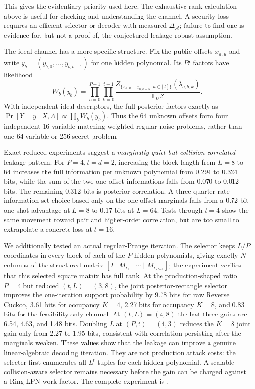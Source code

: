 This gives the evidentiary priority used here.  The exhaustive-rank calculation
above is useful for checking and understanding the channel.  A security loss
requires an efficient selector or decoder with measured $\Delta_{\mathcal A}$;
failure to find one is evidence for, but not a proof of, the conjectured
leakage-robust assumption.

The ideal channel has a more specific structure.  Fix the public offsets
$x_{a,u}$ and write $y_b=(y_{b,0},\ldots,y_{b,t-1})$ for one hidden
polynomial.  Its $Pt$ factors have likelihood
\[
 W_b(y_b)=\prod_{a=0}^{P-1}\prod_{k=0}^{t-1}
 \frac{Z_{\{x_{a,u}+y_{b,k-u}:u\in[t]\}}(\lambda_{a,b,k})}
      {\mathbb E_U Z}.
\]
With independent ideal descriptors, the full posterior factors exactly as
$\Pr[Y=y\mid X,\Lambda]\propto\prod_b W_b(y_b)$.  Thus the 64 unknown
offsets form four independent 16-variable matching-weighted regular-noise
problems, rather than one 64-variable or 256-secret problem.

Exact reduced experiments suggest a \emph{marginally quiet but
collision-correlated} leakage pattern.  For $P=4,t=d=2$, increasing the block
length from $L=8$ to 64 increases the full information per unknown polynomial
from 0.294 to 0.324 bits, while the sum of the two one-offset informations
falls from 0.070 to 0.012 bits.  The remaining 0.312 bits is posterior
correlation.  A three-quarter-rate information-set choice based only on the
one-offset marginals falls from a 0.72-bit one-shot advantage at $L=8$ to 0.17
bits at $L=64$.  Tests through $t=4$ show the same movement toward pair and
higher-order correlation, but are too small to extrapolate a concrete loss at
$t=16$.

We additionally tested an actual regular-Prange iteration.  The selector keeps
$L/P$ coordinates in every block of each of the $P$ hidden polynomials, giving
exactly $N$ columns of the structured matrix
$[I\mid M_{r_1}\mid\cdots\mid M_{r_{P-1}}]$; the experiment verifies that this
selected square matrix has full rank.  At the production-shaped ratio $P=4$
but reduced $(t,L)=(3,8)$, the joint posterior-rectangle selector improves the
one-iteration support probability by 9.78 bits for raw Reverse Cuckoo, 3.61
bits for occupancy $K=4$, 2.27 bits for occupancy $K=8$, and 0.83 bits for the
feasibility-only channel.  At $(t,L)=(4,8)$ the last three gains are 6.54,
4.63, and 1.48 bits.  Doubling $L$ at $(P,t)=(4,3)$ reduces the $K=8$ joint
gain only from 2.27 to 1.95 bits, consistent with correlation persisting after
the marginals weaken.  These values show that the leakage can improve a
genuine linear-algebraic decoding iteration.  They are not production attack
costs: the selector first enumerates all $L^t$ tuples for each hidden
polynomial.  A scalable collision-aware selector remains necessary before the
gain can be charged against a Ring-LPN work factor.  The complete experiment
is .

